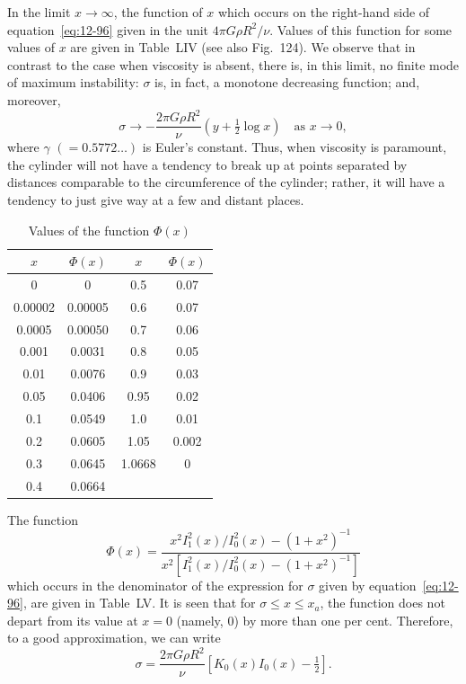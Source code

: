 
In the limit $x \to \infty$, the function of $x$ which occurs on the right-hand side of equation~\eqref{eq:12-96} given in the unit $4\pi G\rho R^2/\nu$. Values of this function for some values of $x$ are given in Table~LIV (see also Fig.~124). We observe that in contrast to the case when viscosity is absent, there is, in this limit, no finite mode of maximum instability: $\sigma$ is, in fact, a monotone decreasing function; and, moreover,
\begin{equation}
\label{eq:12-97}
\sigma \to -\frac{2\pi G\rho R^2}{\nu}(y + \tfrac{1}{2}\log x) \quad \text{as } x \to 0,
\end{equation}
where $\gamma$ $(= 0.5772\ldots)$ is Euler's constant. Thus, when viscosity is paramount, the cylinder will not have a tendency to break up at points separated by distances comparable to the circumference of the cylinder; rather, it will have a tendency to just give way at a few and distant places.

\begin{table}[ht]
\centering
\caption{Values of the function $\Phi(x)$}
\label{tab:LV}
\begin{tabular}{cccc}
\hline
$x$ & $\Phi(x)$ & $x$ & $\Phi(x)$ \\
\hline
0 & 0 & 0.5 & 0.07 \\
0.00002 & 0.00005 & 0.6 & 0.07 \\
0.0005 & 0.00050 & 0.7 & 0.06 \\
0.001 & 0.0031 & 0.8 & 0.05 \\
0.01 & 0.0076 & 0.9 & 0.03 \\
0.05 & 0.0406 & 0.95 & 0.02 \\
0.1 & 0.0549 & 1.0 & 0.01 \\
0.2 & 0.0605 & 1.05 & 0.002 \\
0.3 & 0.0645 & 1.0668 & 0 \\
0.4 & 0.0664 & & \\
\hline
\end{tabular}
\end{table}

The function
\begin{equation}
\label{eq:12-98}
\Phi(x) = \frac{x^2 I_1^2(x)/I_0^2(x) - (1+x^2)^{-1}}{x^2[I_1^2(x)/I_0^2(x)-(1+x^2)^{-1}]}
\end{equation}
which occurs in the denominator of the expression for $\sigma$ given by equation~\eqref{eq:12-96}, are given in Table~LV. It is seen that for $\sigma \leq x \leq x_a$, the function does not depart from its value at $x = 0$ (namely, 0) by more than one per cent. Therefore, to a good approximation, we can write
\begin{equation}
\label{eq:12-99}
\sigma = \frac{2\pi G\rho R^2}{\nu} [K_0(x)I_0(x)-\tfrac{1}{2}].
\end{equation}

